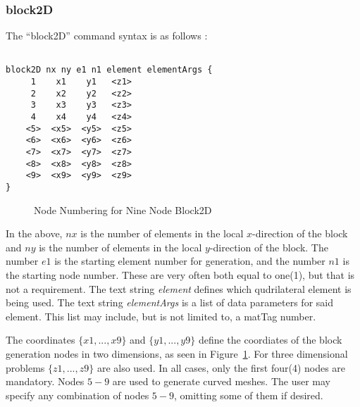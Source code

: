 \documentclass[12pt]{article}
\begin{document}
\subsubsection{block2D}
The ``block2D'' command syntax is as follows :
{\sf\small
\begin{verbatim}

block2D nx ny e1 n1 element elementArgs {
     1    x1    y1   <z1>
     2    x2    y2   <z2>
     3    x3    y3   <z3>
     4    x4    y4   <z4>
    <5>  <x5>  <y5>  <z5>
    <6>  <x6>  <y6>  <z6>
    <7>  <x7>  <y7>  <z7>
    <8>  <x8>  <y8>  <z8>
    <9>  <x9>  <y9>  <z9>
}
\end{verbatim}

\begin{figure}[htpb]
\begin{center}
\epsfysize=2.0in
\end{center}
\caption{Node Numbering for Nine Node Block2D}
\label{blocknodenumbering}
\end{figure}
}

In the above, $nx$ is the number of elements in the local $x$-direction of
the block and $ny$ is the number of elements in the local $y$-direction of
the block.  The number $e1$ is the starting element number for generation, and 
the number $n1$ is the starting node number.  These are very often both equal to 
one(1), but that is not a requirement.  The text string {\em element} defines 
which qudrilateral element is being used.  The text string {\em elementArgs}
is a list of data parameters for said element.  This list may include, but is
not limited to, a matTag number.

The coordinates $\{x1,...,x9\}$ and $\{y1,...,y9\}$ define the coordiates
of the block generation nodes in two dimensions, as seen in Figure~\ref{blocknodenumbering}.
For three dimensional 
problems $\{z1,...,z9\}$ are also used.  In all cases, only the first four(4) 
nodes are mandatory. Nodes $5-9$ are used to generate curved meshes.
The user may specify any combination of nodes $5-9$, omitting some of them
if desired.
\end{document}
